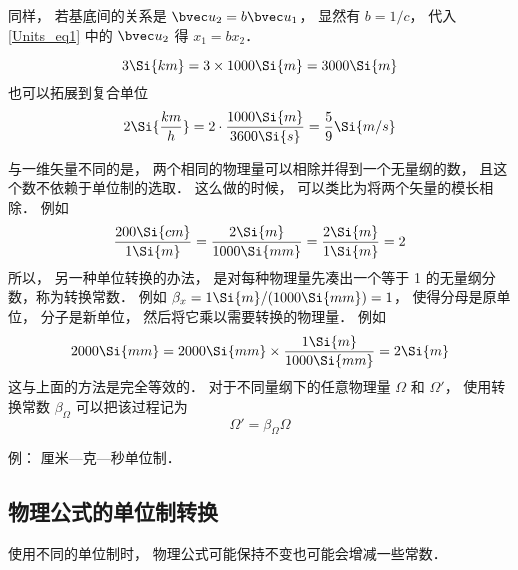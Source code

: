 同样， 若基底间的关系是 $\bvec u_2 = b\bvec u_1$， 显然有 $b = 1/c$， 代入\autoref{Units_eq1} 中的 $\bvec u_2$ 得 $x_1 = b x_2$．

\begin{example}{}
\begin{equation}
3 \Si{km} = 3\times 1000\Si{m} = 3000\Si{m}
\end{equation}
也可以拓展到复合单位
\begin{equation}
2 \Si{\frac{km}{h}} = 2\cdot \frac{1000 \Si{m}}{3600 \Si{s}} = \frac{5}{9}\Si{m/s}
\end{equation}
\end{example}

与一维矢量不同的是， 两个相同的物理量可以相除并得到一个无量纲的数， 且这个数不依赖于单位制的选取． 这么做的时候， 可以类比为将两个矢量的模长相除． 例如
\begin{equation}
\frac{200\Si{cm}}{1\Si{m}} = \frac{2\Si{m}}{1000\Si{mm}} = \frac{2\Si{m}}{1\Si{m}} = 2
\end{equation}
所以， 另一种单位转换的办法， 是对每种物理量先凑出一个等于 1 的无量纲分数，称为转换常数． 例如 $\beta_x = 1\Si{m}/(1000\Si{mm}) = 1$， 使得分母是原单位， 分子是新单位， 然后将它乘以需要转换的物理量． 例如
\begin{equation}
2000\Si{mm} = 2000\Si{mm} \times \frac{1\Si{m}}{1000\Si{mm}} = 2\Si{m}
\end{equation}
这与上面的方法是完全等效的． 对于不同量纲下的任意物理量 $\Omega$ 和 $\Omega'$， 使用转换常数 $\beta_\Omega$ 可以把该过程记为
\begin{equation}
\Omega' = \beta_\Omega \Omega
\end{equation}

例： 厘米—克—秒单位制．

\subsection{物理公式的单位制转换}
使用不同的单位制时， 物理公式可能保持不变也可能会增减一些常数．

